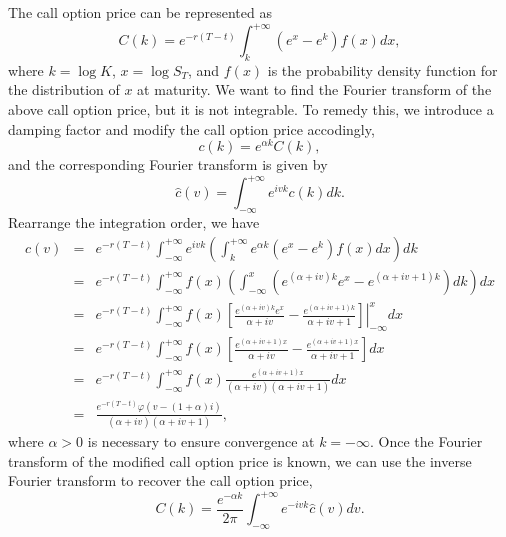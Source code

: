 \documentclass[12pt]{article}
\begin{document}
    The call option price can be represented as
    \begin{equation}
      C(k)=e^{-r(T-t)}\int_k^{+\infty}(e^x-e^k)f(x)dx,
    \end{equation}
    where $k=\log K$, $x=\log S_T$, and $f(x)$ is the probability density function for the distribution of $x$ at maturity. We want to find the
    Fourier transform of the above call option price, but it is not integrable. To remedy this, we introduce a damping factor and modify the
    call option price accodingly,
    \begin{equation}
      c(k)=e^{\alpha k}C(k),
    \end{equation}
    and the corresponding Fourier transform is given by
    \begin{equation}
      \hat{c}(v)=\int_{-\infty}^{+\infty}e^{ivk}c(k)dk.
    \end{equation}
    Rearrange the integration order, we have
    \begin{eqnarray}
      \hat{c}(v) &=& e^{-r(T-t)}\int_{-\infty}^{+\infty}e^{ivk}\left(\int_k^{+\infty}e^{\alpha k}(e^x-e^k)f(x)dx\right)dk \nonumber\\
                 &=& e^{-r(T-t)}\int_{-\infty}^{+\infty}f(x)\left(\int_{-\infty}^x\left(e^{(\alpha+iv)k}e^x-e^{(\alpha+iv+1)k}\right)dk\right)dx \nonumber\\
                 &=& e^{-r(T-t)}\int_{-\infty}^{+\infty}f(x)\left.\left[\frac{e^{(\alpha+iv)k}e^x}{\alpha+iv}
                                                        -\frac{e^{(\alpha+iv+1)k}}{\alpha+iv+1}\right]\right|_{-\infty}^{x}dx \nonumber\\
                 &=& e^{-r(T-t)}\int_{-\infty}^{+\infty}f(x)\left[\frac{e^{(\alpha+iv+1)x}}{\alpha+iv} -\frac{e^{(\alpha+iv+1)x}}{\alpha+iv+1}\right]dx \nonumber\\
                 &=& e^{-r(T-t)}\int_{-\infty}^{+\infty}f(x)\frac{e^{(\alpha+iv+1)x}}{(\alpha+iv)(\alpha+iv+1)}dx \nonumber\\
                 &=& \frac{e^{-r(T-t)}\varphi(v-(1+\alpha)i)}{(\alpha+iv)(\alpha+iv+1)},
    \end{eqnarray}
    where $\alpha > 0$ is necessary to ensure convergence at $k=-\infty$. Once the Fourier transform of the modified call option price is known,
    we can use the inverse Fourier transform to recover the call option price,
    \begin{equation}
      C(k)=\frac{e^{-\alpha k}}{2\pi}\int_{-\infty}^{+\infty}e^{-ivk}\hat{c}(v)dv.
    \end{equation}
\end{document}
